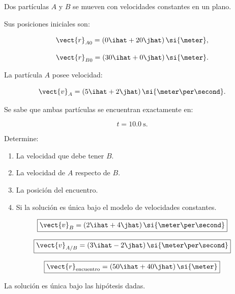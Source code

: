 \begin{ejercicio}
Dos partículas \(A\) y \(B\) se mueven
con velocidades constantes en un plano.

Sus posiciones iniciales son:

\[
\vect{r}_{A0}
=
(0\ihat+20\jhat)\,\si{\meter},
\]

\[
\vect{r}_{B0}
=
(30\ihat+0\jhat)\,\si{\meter}.
\]

La partícula \(A\) posee velocidad:

\[
\vect{v}_A
=
(5\ihat+2\jhat)\,
\si{\meter\per\second}.
\]

Se sabe que ambas partículas se encuentran
exactamente en:

\[
t=\SI{10.0}{\second}.
\]

Determine:

\begin{enumerate}[label=\alph*)]
    \item La velocidad que debe tener \(B\).
    \item La velocidad de \(A\) respecto de \(B\).
    \item La posición del encuentro.
    \item Si la solución es única bajo
    el modelo de velocidades constantes.
\end{enumerate}
\end{ejercicio}

\begin{respuesta}
\[
\boxed{
\vect{v}_B
=
(2\ihat+4\jhat)\,
\si{\meter\per\second}
}
\]

\[
\boxed{
\vect{v}_{A/B}
=
(3\ihat-2\jhat)\,
\si{\meter\per\second}
}
\]

\[
\boxed{
\vect{r}_{\mathrm{encuentro}}
=
(50\ihat+40\jhat)\,\si{\meter}
}
\]

La solución es única bajo las hipótesis dadas.
\end{respuesta}

